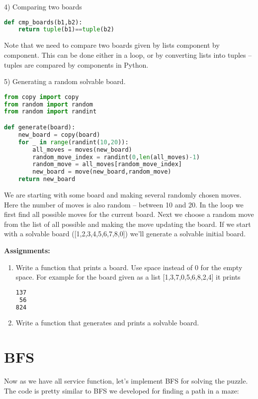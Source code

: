 4) Comparing two boards

\begin{lstlisting}[language=Python,style=codelst2,caption={Python: 8-puzzle, comparing board}]
def cmp_boards(b1,b2):
    return tuple(b1)==tuple(b2)
\end{lstlisting}
Note that we need to compare two boards given by 
lists component by component.
This can be done either in a loop, or by converting lists into
tuples -- tuples are compared by components in Python.

\newpage

5) Generating a random solvable board.

\begin{lstlisting}[language=Python,style=codelst2,caption={Python: 8-puzzle, generating a board}]
from copy import copy
from random import random
from random import randint

def generate(board):
    new_board = copy(board)
    for _ in range(randint(10,20)):
        all_moves = moves(new_board)
        random_move_index = randint(0,len(all_moves)-1)
        random_move = all_moves[random_move_index]
        new_board = move(new_board,random_move)
    return new_board
\end{lstlisting}
We are starting with some board and making several randomly chosen 
moves. Here the number of moves is also random -- between 10 and 20.
In the loop we first find all possible moves for the current board.
Next we choose a random move from the list of all possible and 
making the move updating the board. If we start with a solvable 
board ([1,2,3,4,5,6,7,8,0]) we'll generate a solvable initial
board.

\begin{tcolorbox}
\textbf{Assignments:}
\begin{enumerate}
\item Write a function that prints a board. Use space instead of 0
for the empty space. For example for the board
given as a list [1,3,7,0,5,6,8,2,4] it prints
\begin{lstlisting}[language=bash]
137
 56
824
\end{lstlisting}
\item Write a function that generates and prints a solvable board.
\end{enumerate}
\end{tcolorbox}

\section{BFS}
Now as we have all service function, let's implement BFS for solving
the puzzle. The code is pretty similar to BFS we developed for
finding a path in a maze:

